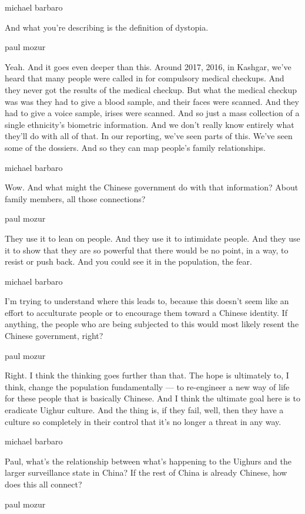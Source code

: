michael barbaro

And what you're describing is the definition of dystopia.

paul mozur

Yeah. And it goes even deeper than this. Around 2017, 2016, in Kashgar,
we've heard that many people were called in for compulsory medical
checkups. And they never got the results of the medical checkup. But
what the medical checkup was was they had to give a blood sample, and
their faces were scanned. And they had to give a voice sample, irises
were scanned. And so just a mass collection of a single ethnicity's
biometric information. And we don't really know entirely what they'll do
with all of that. In our reporting, we've seen parts of this. We've seen
some of the dossiers. And so they can map people's family relationships.

michael barbaro

Wow. And what might the Chinese government do with that information?
About family members, all those connections?

paul mozur

They use it to lean on people. And they use it to intimidate people. And
they use it to show that they are so powerful that there would be no
point, in a way, to resist or push back. And you could see it in the
population, the fear.

michael barbaro

I'm trying to understand where this leads to, because this doesn't seem
like an effort to acculturate people or to encourage them toward a
Chinese identity. If anything, the people who are being subjected to
this would most likely resent the Chinese government, right?

paul mozur

Right. I think the thinking goes further than that. The hope is
ultimately to, I think, change the population fundamentally --- to
re-engineer a new way of life for these people that is basically
Chinese. And I think the ultimate goal here is to eradicate Uighur
culture. And the thing is, if they fail, well, then they have a culture
so completely in their control that it's no longer a threat in any way.

michael barbaro

Paul, what's the relationship between what's happening to the Uighurs
and the larger surveillance state in China? If the rest of China is
already Chinese, how does this all connect?

paul mozur


